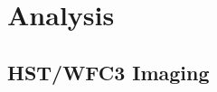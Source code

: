 \documentclass[apj]{emulateapj}
\newcommand{\kms}{km~s$^{-1}$}
\newcommand{\mgii}{\textrm{Mg}~\textsc{ii}}
\newcommand{\lrest}{\lambda_{\textnormal{\scriptsize{rest}}}}
\newcommand{\lobs}{\lambda_{\textnormal{\scriptsize{obs}}}}
\begin{document}













\section{Analysis}

\subsection{HST/WFC3 Imaging}
\end{document}
